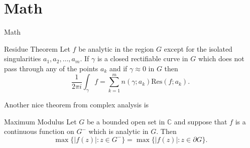 \documentclass[xcolor={svgnames,table},10pt,fleqn]{beamer}
\begin{document}
\section{Math}

\begin{frame}{Math}
\begin{block}{Residue Theorem}
Let $f$ be analytic in the region $G$ except for the isolated singularities $a_1,a_2,\ldots,a_m$. If $\gamma$ is a closed rectifiable curve in $G$ which does not pass through any of the points $a_k$ and if $\gamma\approx 0$ in $G$ then
\[
\frac{1}{2\pi i}\int_\gamma f = \sum_{k=1}^m n(\gamma;a_k) \text{Res}(f;a_k).
\]
\end{block}

Another nice theorem from complex analysis is

\begin{block}{Maximum Modulus}
Let $G$ be a bounded open set in $\mathbb{C}$ and suppose that $f$ is a continuous function on $G^-$ which is analytic in $G$. Then
\[
\max\{|f(z)|:z\in G^-\}=\max \{|f(z)|:z\in \partial G \}.
\]
\end{block}
\end{frame}




\begin{frame}[plain]
\end{frame}
\end{document}
